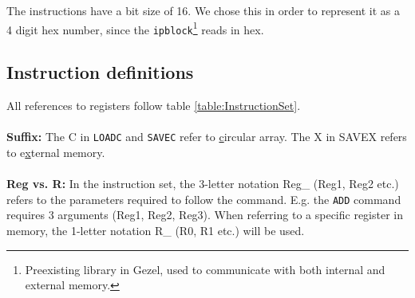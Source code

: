 The instructions have a bit size of 16. We chose this in order to represent it as a 4 digit hex number, since the \texttt{ipblock}\footnote{Preexisting library in Gezel, used to communicate with both internal and external memory.} reads in hex.

\subsection{Instruction definitions}
\label{sec:instructionDefinitions}

All references to registers follow table \ref{table:InstructionSet}.\\
\\
\textbf{Suffix:} The C in \texttt{LOADC} and \texttt{SAVEC} refer to \underline{c}ircular array. The X in SAVEX refers to e\underline{x}ternal memory.\\ 
\\
\textbf{Reg vs. R:} In the instruction set, the 3-letter notation Reg\_ (Reg1, Reg2 etc.) refers to the parameters required to follow the command. E.g. the \texttt{ADD} command requires 3 arguments (Reg1, Reg2, Reg3). When referring to a specific register in memory, the 1-letter notation R\_ (R0, R1 etc.) will be used.

